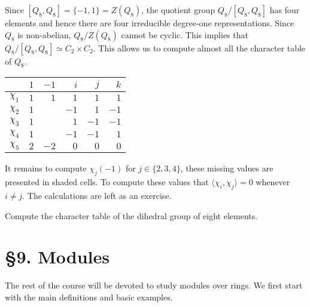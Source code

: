 \begin{example}
	Since $[Q_8,Q_8]=\{-1,1\}=Z(Q_8)$, the quotient group $Q_8/[Q_8,Q_8]$ has four elements and
	hence there are four irreducible degree-one representations. Since 
	$Q_8$ is non-abelian, $Q_8/Z(Q_8)$ cannot be cyclic. 
	This implies that 
	$Q_8/[Q_8,Q_8]\simeq C_2\times C_2$. This allows us
	to compute almost all the character table of $Q_8$. 
		\begin{center}
		\begin{tabular}{|c|rrrrr|}
			\hline
			& $1$ & $-1$ & $i$ & $j$ & $k$\tabularnewline
			\hline
			$\chi_1$ & $1$ & $1$ & $1$ & $1$ & $1$\tabularnewline
			$\chi_2$ & $1$ & \cellcolor{gray!30}{$1$} & $-1$ & $1$ & $-1$\tabularnewline
			$\chi_3$ & $1$ & \cellcolor{gray!30}{$1$} & $1$ & $-1$ & $-1$\tabularnewline
			$\chi_4$ & $1$ & \cellcolor{gray!30}{$1$} & $-1$ & $-1$ & $1$\tabularnewline
			$\chi_5$ & $2$ & $-2$ & $0$ & $0$ & $0$\tabularnewline
			\hline
		\end{tabular}
	\end{center}
	It remains to compute $\chi_j(-1)$ for $j\in\{2,3,4\}$, these missing values are presented in shaded
    cells. To compute these values that $\langle\chi_i,\chi_j\rangle=0$ whenever $i\ne j$. The calculations
    are left as an exercise. 



\end{example}

\begin{exercise}
    Compute the character table of the dihedral group of eight elements. 
\end{exercise}

\section*{\S9. Modules}

The rest of the course will be devoted to study modules over rings. 
We first start with the main definitions and basic examples.

